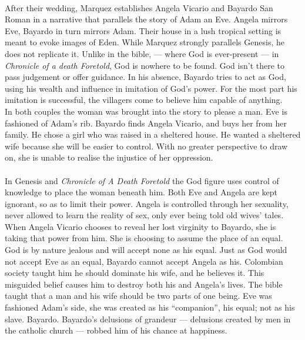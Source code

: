 \documentclass[11pt,a4wide]{article}
\begin{document}

\paragraph{}After their wedding, Marquez establishes Angela Vicario and Bayardo 
San Roman in a narrative that parallels the story of Adam an Eve. Angela mirrors
Eve, Bayardo in turn mirrors Adam. Their house in a lush tropical setting is 
meant to evoke images of Eden. While Marquez strongly parallels Genesis,
he does not replicate it. Unlike in the bible, --- where God is ever-present
--- in \emph{Chronicle of a death Foretold}, God is nowhere to be found. God 
isn't there to pass judgement or offer guidance. In his absence, Bayardo tries
to act as God, using his wealth and influence in imitation of God's power.
For the most part his imitation is successful,
the villagers come to believe him capable of anything.  
\cite[pg.~27]{chronicle}\\


In both couples the woman was brought into the story to please a man. Eve is
fashioned of Adam's rib. Bayardo finds Angela Vicario, and buys her from her
family. He chose a girl who was raised in a sheltered house. He wanted a 
sheltered wife because she will be easier to control. With no greater perspective
to draw on, she is unable to realise the injustice of her oppression. \cite[pg.~34]{chronicle} 

\paragraph{}In Genesis and \emph{Chronicle of A Death Foretold} the God figure
uses control of knowledge to place the woman beneath him. Both Eve and Angela
are kept ignorant, so as to limit their power. Angela is controlled through
her sexuality, never allowed to learn the reality of sex, only ever
being told old wives' tales. When Angela Vicario chooses to reveal her lost 
virginity to Bayardo, she is taking that power from him. She is choosing to
assume the place of an equal. God is by nature jealous 
\cite[Exodus 20:50]{bible} and will accept none as his equal. Just as God would
not accept Eve as an equal, Bayardo cannot accept Angela as his.
Colombian society taught him he should dominate his wife, and he believes it. 
This misguided belief causes him to destroy both his and Angela's lives. 
The bible taught that a man and his wife should be two parts of one being.
Eve was fashioned Adam's side, she was created as his ``companion'', his equal;
not as his slave. Bayardo. Bayardo's delusions of grandeur --- delusions created
by men in the catholic church --- robbed him of his chance at happiness.
\end{document}
